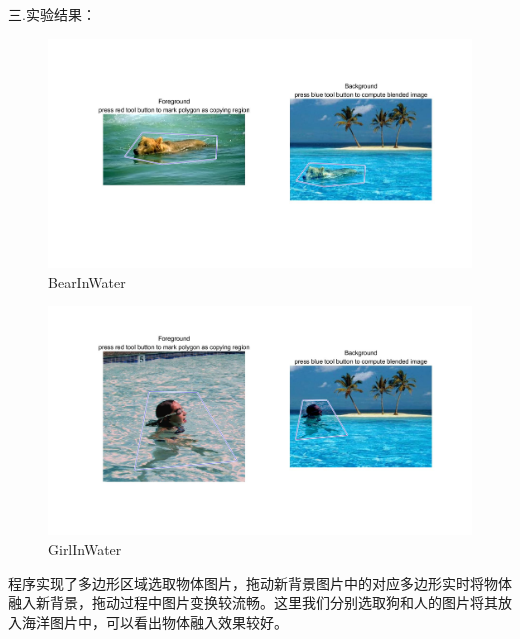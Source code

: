 \documentclass[a4paper]{ltxdoc}
\begin{document}
\newpage
三.实验结果：
\begin{figure}[htb]
  \centering
  \includegraphics[width=1.0\textwidth]{fig1.jpg}
  \caption{BearInWater}
  \label{fig:fig-1}
\end{figure}

\begin{figure}[htb]
  \centering
  \includegraphics[width=1.0\textwidth]{fig3.jpg}
  \caption{GirlInWater}
  \label{fig:fig-1}
\end{figure}

\newpage
程序实现了多边形区域选取物体图片，拖动新背景图片中的对应多边形实时将物体融入新背景，拖动过程中图片变换较流畅。这里我们分别选取狗和人的图片将其放入海洋图片中，可以看出物体融入效果较好。
\end{document}
